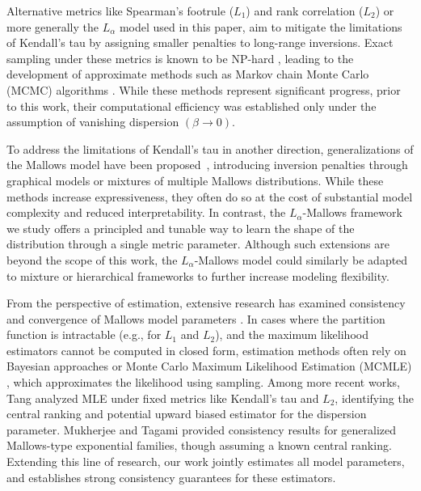 \documentclass{article}
\begin{document}
Alternative metrics like Spearman’s footrule ($L_1$) and rank correlation ($L_2$) or more generally the $L_\alpha$ model used in this paper,  aim to mitigate the limitations of Kendall’s tau by assigning smaller penalties to long-range inversions.
Exact sampling under these metrics is known to be NP-hard \cite{bartholdi1989voting}, leading to the development of approximate methods such as Markov chain Monte Carlo (MCMC) algorithms \cite{zhong2021mallows,vitelli2018probabilistic}. While these methods represent significant progress, prior to this work, their computational efficiency was established only under the assumption of vanishing dispersion $(\beta\to0)$.

To address the limitations of Kendall’s tau in another direction, generalizations of the Mallows model have been proposed~\cite{braverman2009sorting,liu2018efficiently,meilua2022recursive}, introducing inversion penalties through graphical models or mixtures of multiple Mallows distributions. While these methods increase expressiveness, they often do so at the cost of substantial model complexity and reduced interpretability. In contrast, the $L_\alpha$-Mallows framework we study offers a principled and tunable way to learn the shape of the distribution through a single metric parameter. Although such extensions are beyond the scope of this work, the $L_\alpha$-Mallows model could similarly be adapted to mixture or hierarchical frameworks to further increase modeling flexibility.

From the perspective of estimation,  extensive research has examined consistency and convergence of Mallows model parameters \cite{vitelli2018probabilistic,awasthi2014learning,feng2022mallows, mao2022learning, busa2019optimal}. In cases where the partition function is intractable (e.g., for $L_1$ and $L_2$), and the maximum likelihood estimators cannot be computed in closed form, estimation methods often rely on Bayesian approaches \cite{vitelli2018probabilistic} or Monte Carlo Maximum Likelihood Estimation (MCMLE) \cite{geyer1992constrained}, which approximates the likelihood using sampling. Among more recent works,  Tang \cite{tang2019mallows} analyzed  MLE under fixed metrics like Kendall's tau and $L_2$, identifying the central ranking and potential upward biased
estimator for the dispersion parameter. Mukherjee and Tagami \cite{mukherjee2016estimation,mukherjee2023inference} provided consistency results for generalized Mallows-type exponential families, though assuming a known central ranking.  Extending this
line of research, our work jointly estimates all model parameters, and establishes strong consistency guarantees for these
estimators. 
\end{document}
